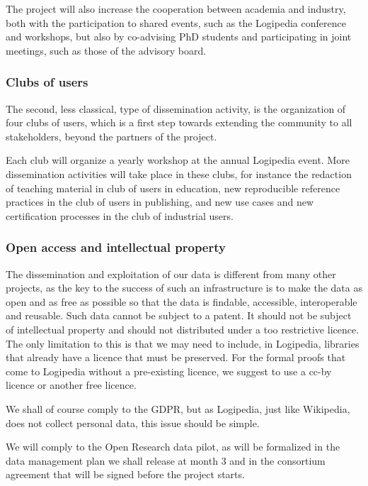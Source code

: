 The project will also increase the cooperation between academia and
industry, both with the participation to shared events, such as the
Logipedia conference and workshops, but also by co-advising PhD students
and participating in joint meetings, such as those of the advisory
board.

\subsubsection*{Clubs of users}

The second, less classical, type of dissemination activity, is the
organization of four clubs of users, which is a first step towards
extending the community to all stakeholders, beyond the partners of
the project.

Each club will organize a yearly workshop at the annual Logipedia
event. More dissemination activities will take place in these clubs,
for instance the redaction of teaching material in club of users in
education, new reproducible reference practices in the club of users
in publishing, and new use cases and new certification processes in the
club of industrial users.

\subsubsection*{Open access and intellectual property}

The dissemination and exploitation of our data is different from many
other projects, as the key to the success of such an infrastructure is
to make the data as open and as free as possible so that the data is
findable, accessible, interoperable and reusable. Such data cannot be
subject to a patent. It should not be subject of intellectual property
and should not distributed under a too restrictive licence.  The only
limitation to this is that we may need to include, in Logipedia,
libraries that already have a licence that must be preserved.  For the
formal proofs that come to Logipedia without a pre-existing licence,
we suggest to use a cc-by licence or another free licence.

We shall of course comply to the GDPR, but as Logipedia, just like 
Wikipedia, does not collect personal data, this issue should be simple.

We will comply to the Open Research data pilot, as will be formalized
in the data management plan we shall release at month 3 and in the
consortium agreement that will be signed before the project starts.

